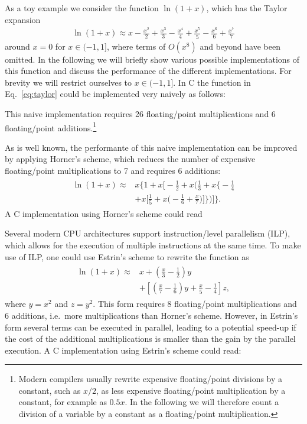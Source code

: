 \documentclass[10pt,DIV16,twocolumn,numbers=noenddot]{scrartcl}
\begin{document}
As a toy example we consider the function $\ln(1+x)$, which has the
Taylor expansion
%
\begin{align}
  \ln(1+x) \approx x - \frac{x^2}{2} + \frac{x^3}{3} - \frac{x^4}{4} + \frac{x^5}{5} - \frac{x^6}{6} + \frac{x^7}{7}
  \label{eq:taylor}
\end{align}
%
around $x=0$ for $x\in(-1,1]$, where terms of $O(x^8)$ and beyond have
been omitted.  In the following we will briefly show various possible
implementations of this function and discuss the performance of the
different implementations.  For brevity we will restrict ourselves to
$x\in(-1,1]$.  In C the function in Eq.~\eqref{eq:taylor} could be
implemented very naively as follows:
%

%
This naive implementation requires 26 floating\-/point multiplications
and 6 floating\-/point additions.\footnote{Modern compilers usually
  rewrite expensive floating\-/point divisions by a constant, such as
  $x/2$, as less expensive floating\-/point multiplication by a
  constant, for example as $0.5x$.  In the following we will therefore
  count a division of a variable by a constant as a floating\-/point
  multiplication.}

As is well known, the performante of this naive implementation can be
improved by applying Horner's scheme, which reduces the number of
expensive floating\-/point multiplications to 7 and requires 6
additions:
%
\begin{align}
\begin{split}
  \ln(1+x) \approx{}& x \Bigg\{1 + x \Bigg[-\frac{1}{2} + x \Bigg(\frac{1}{3} + x \Bigg\{-\frac{1}{4} \\
  &+ x \Bigg[\frac{1}{5} + x\Bigg(-\frac{1}{6} + \frac{x}{7}\Bigg)\Bigg]\Bigg\}\Bigg)\Bigg]\Bigg\}.
\end{split}\label{eq:horner}%
\end{align}
%
A C implementation using Horner's scheme could read
%


Several modern CPU architectures support instruction\-/level
parallelism (ILP), which allows for the execution of multiple
instructions at the same time.  To make use of ILP, one could use
Estrin's scheme \cite{estrin} to rewrite the function as
%
\begin{align}
\begin{split}
  \ln(1+x) \approx{}& x + \left(\frac{x}{3}-\frac{1}{2}\right)
    y \\ &+\left[\left(\frac{x}{7}-\frac{1}{6}\right)
    y+\frac{x}{5}-\frac{1}{4}\right] z,
\end{split}\label{eq:estrin}%
\end{align}
%
where $y=x^2$ and $z=y^2$.  This form requires 8 floating\-/point
multiplications and 6 additions, i.e.\ more multiplications than
Horner's scheme.  However, in Estrin's form several terms can be
executed in parallel, leading to a potential speed-up if the cost of
the additional multiplications is smaller than the gain by the
parallel execution.  A C implementation using Estrin's scheme could
read:
%

\end{document}
